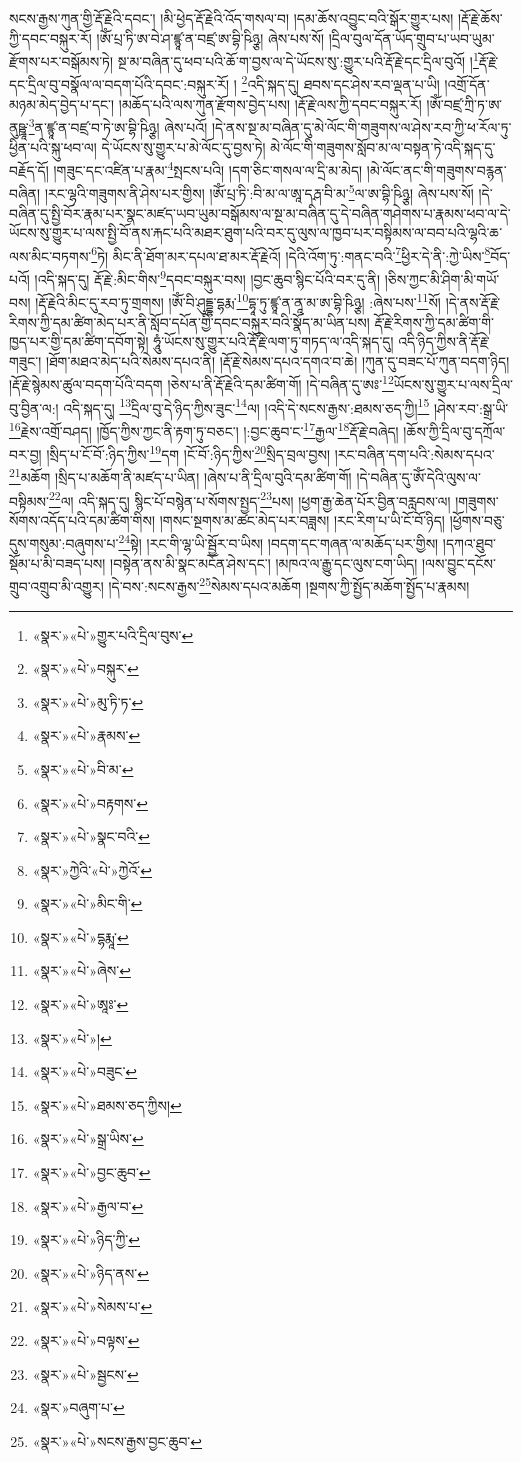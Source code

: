 སངས་རྒྱས་ཀུན་གྱི་རྡོ་རྗེའི་དབང་། །མི་ཕྱེད་རྡོ་རྗེའི་འོད་གསལ་བ། །དམ་ཆོས་འབྱུང་བའི་སྒོར་གྱུར་པས། །རྡོ་རྗེ་ཆོས་ཀྱི་དབང་བསྐུར་རོ། །ཨོཾ་པྲ་ཏི་ཨ་བེ་ཤ་ཛྙཱ་ན་བཛྲ་ཨ་བྷི་ཥིཉྩ། ཞེས་པས་སོ། །དྲིལ་བུལ་དོན་ཡོད་གྲུབ་པ་ཡབ་ཡུམ་རྫོགས་པར་བསྒོམས་ཏེ། སྔ་མ་བཞིན་དུ་ཕབ་པའི་ཆོ་ག་བྱས་ལ་དེ་ཡོངས་སུ་:གྱུར་པའི་རྡོ་རྗེ་དང་དྲིལ་བུའོ། །\footnote{«སྣར་»«པེ་»གྱུར་པའི་དྲིལ་བུས་}རྡོ་རྗེ་དང་དྲིལ་བུ་བསྣོལ་ལ་བདག་པོའི་དབང་:བསྐུར་རོ། །
\footnote{«སྣར་»«པེ་»བསྐུར་}འདི་སྐད་དུ། ཐབས་དང་ཤེས་རབ་ལྡན་པ་ཡི། །འགྲོ་དོན་མཉམ་མེད་བྱེད་པ་དང་། །མཆོད་པའི་ལས་ཀུན་རྫོགས་བྱེད་པས། །རྡོ་རྗེ་ལས་ཀྱི་དབང་བསྐུར་རོ། །ཨོཾ་བཛྲ་ཀྲི་ཏ་ཨ་ནུཥྛཱ་\footnote{«སྣར་»«པེ་»མུ་ཏི་ཏ་}ན་ཛྙཱ་ན་བཛྲ་བ་ཏེ་ཨ་བྷི་ཥིཉྩ། ཞེས་པའོ། །དེ་ནས་སྔ་མ་བཞིན་དུ་མེ་ལོང་གི་གཟུགས་ལ་ཤེས་རབ་ཀྱི་ཕ་རོལ་ཏུ་ཕྱིན་པའི་སྐུ་ཕབ་ལ། དེ་ཡོངས་སུ་གྱུར་པ་མེ་ལོང་དུ་བྱས་ཏེ། མེ་ལོང་གི་གཟུགས་སློབ་མ་ལ་བསྟན་ཏེ་འདི་སྐད་དུ་བརྗོད་དོ། །གཟུང་དང་འཛིན་པ་རྣམ་\footnote{«སྣར་»«པེ་»རྣམས་}སྤངས་པའི། །དག་ཅིང་གསལ་ལ་དྲི་མ་མེད། །མེ་ལོང་ནང་གི་གཟུགས་བརྙན་བཞིན། །རང་ལྷའི་གཟུགས་ནི་ཤེས་པར་གྱིས། །ཨོཾ་པྲ་ཏི་:བི་མ་ལ་ཨཱ་དརྴ་བི་མ་\footnote{«སྣར་»«པེ་»བི་མ་}ལ་ཨ་བྷི་ཥིཉྩ། ཞེས་པས་སོ། །དེ་བཞིན་དུ་སྤྱི་བོར་རྣམ་པར་སྣང་མཛད་ཡབ་ཡུམ་བསྒོམས་ལ་སྔ་མ་བཞིན་དུ་དེ་བཞིན་གཤེགས་པ་རྣམས་ཕབ་ལ་དེ་ཡོངས་སུ་གྱུར་པ་ལས་སྤྱི་བོ་ནས་རྐང་པའི་མཐར་ཐུག་པའི་བར་དུ་ལུས་ལ་ཁྱབ་པར་བསྟིམས་ལ་བབ་པའི་ལྷའི་ཆ་ལས་མིང་བཏགས་\footnote{«སྣར་»«པེ་»བརྟགས་}ཏེ། མིང་ནི་ཐོག་མར་དཔལ་ཐ་མར་རྡོ་རྗེའོ། །དེའི་འོག་ཏུ་:གནང་བའི་\footnote{«སྣར་»«པེ་»སྣང་བའི་}ཕྱིར་དེ་ནི་:ཀྱེ་ཡིས་\footnote{«སྣར་»ཀྱེའི་«པེ་»ཀྱེའོ་}བོད་པའོ། །འདི་སྐད་དུ། རྡོ་རྗེ་:མིང་གིས་\footnote{«སྣར་»«པེ་»མིང་གི་}དབང་བསྐུར་བས། །བྱང་ཆུབ་སྙིང་པོའི་བར་དུ་ནི། །ཅིས་ཀྱང་མི་ཤིག་མི་གཡོ་བས། །རྡོ་རྗེའི་མིང་དུ་རབ་ཏུ་གྲགས། །ཨོཾ་བི་ཤུདྡྷ་དྷརྨ་\footnote{«སྣར་»«པེ་»དྷརྨཱ་}དྷཱ་ཏུ་ཛྙཱ་ན་ནཱ་མ་ཨ་བྷི་ཥིཉྩ། :ཞེས་པས་\footnote{«སྣར་»«པེ་»ཞེས་}སོ། །དེ་ནས་རྡོ་རྗེ་རིགས་ཀྱི་དམ་ཚིག་མེད་པར་ནི་སློབ་དཔོན་གྱི་དབང་བསྐུར་བའི་སྣོད་མ་ཡིན་པས། རྡོ་རྗེ་རིགས་ཀྱི་དམ་ཚིག་གི་ཁྱད་པར་གྱི་དམ་ཚིག་དབོག་སྟེ། ཧཱུཾ་ཡོངས་སུ་གྱུར་པའི་རྡོ་རྗེ་ལག་ཏུ་གཏད་ལ་འདི་སྐད་དུ། འདི་ཉིད་ཀྱིས་ནི་རྡོ་རྗེ་གཟུང་། །ཐོག་མཐའ་མེད་པའི་སེམས་དཔའ་ནི། །རྡོ་རྗེ་སེམས་དཔའ་དགའ་བ་ཆེ། །ཀུན་དུ་བཟང་པོ་ཀུན་བདག་ཉིད། །རྡོ་རྗེ་སྙེམས་ཚུལ་བདག་པོའི་བདག །ཅེས་པ་ནི་རྡོ་རྗེའི་དམ་ཚིག་གོ། །དེ་བཞིན་དུ་ཨཿ་\footnote{«སྣར་»«པེ་»ཨཱཿ་}ཡོངས་སུ་གྱུར་པ་ལས་དྲིལ་བུ་བྱིན་ལ:། འདི་སྐད་དུ། \footnote{«སྣར་»«པེ་»།  }དྲིལ་བུ་དེ་ཉིད་ཀྱིས་ཟུང་\footnote{«སྣར་»«པེ་»བཟུང་}ལ། །འདི་དེ་སངས་རྒྱས་:ཐམས་ཅད་ཀྱི།\footnote{«སྣར་»«པེ་»ཐམས་ཅད་ཀྱིས།} །ཤེས་རབ་:སྒྲ་ཡི་\footnote{«སྣར་»«པེ་»སྒྲ་ཡིས་}རྗེས་འགྲོ་བཤད། །ཁྱོད་ཀྱིས་ཀྱང་ནི་རྟག་ཏུ་བཅང་། །:བྱང་ཆུབ་ང་\footnote{«སྣར་»«པེ་»བྱང་ཆུབ་}རྒྱལ་\footnote{«སྣར་»«པེ་»རྒྱལ་བ་}རྡོ་རྗེ་བཞེད། །ཆོས་ཀྱི་དྲིལ་བུ་དཀྲོལ་བར་བྱ། །སྲིད་པ་ངོ་བོ་:ཉིད་ཀྱིས་\footnote{«སྣར་»«པེ་»ཉིད་ཀྱི་}དག །ངོ་བོ་:ཉིད་ཀྱིས་\footnote{«སྣར་»«པེ་»ཉིད་ནས་}སྲིད་བྲལ་བྱས། །རང་བཞིན་དག་པའི་:སེམས་དཔའ་\footnote{«སྣར་»«པེ་»སེམས་པ་}མཆོག །སྲིད་པ་མཆོག་ནི་མཛད་པ་ཡིན། །ཞེས་པ་ནི་དྲིལ་བུའི་དམ་ཚིག་གོ། །དེ་བཞིན་དུ་ཨོཾ་དེའི་ལུས་ལ་བསྟིམས་\footnote{«སྣར་»«པེ་»བལྟས་}ལ། འདི་སྐད་དུ། སྙིང་པོ་བསྙེན་པ་སོགས་སྤྱད་\footnote{«སྣར་»«པེ་»སྦྱངས་}པས། །ཕྱག་རྒྱ་ཆེན་པོར་བྱིན་བརླབས་ལ། །གཟུགས་སོགས་འདོད་པའི་དམ་ཚིག་གིས། །གསང་སྔགས་མ་ཚང་མེད་པར་བཟླས། །རང་རིག་པ་ཡི་ངོ་བོ་ཉིད། །ཕྱོགས་བཅུ་དུས་གསུམ་:བཞུགས་པ་\footnote{«སྣར་»བཞུག་པ་}སྟེ། །རང་གི་ལྷ་ཡི་སྦྱོར་བ་ཡིས། །བདག་དང་གཞན་ལ་མཆོད་པར་གྱིས། །དཀའ་ཐུབ་སྡོམ་པ་མི་བཟད་པས། །བསྟེན་ནས་མི་སྣང་མངོན་ཤེས་དང་། །མཁའ་ལ་རྒྱུ་དང་ལུས་ངག་ཡིད། །ལས་བྱུང་དངོས་གྲུབ་འགྲུབ་མི་འགྱུར། །དེ་བས་:སངས་རྒྱས་\footnote{«སྣར་»«པེ་»སངས་རྒྱས་བྱང་ཆུབ་}སེམས་དཔའ་མཆོག །སྔགས་ཀྱི་སྤྱོད་མཆོག་སྤྱོད་པ་རྣམས། 